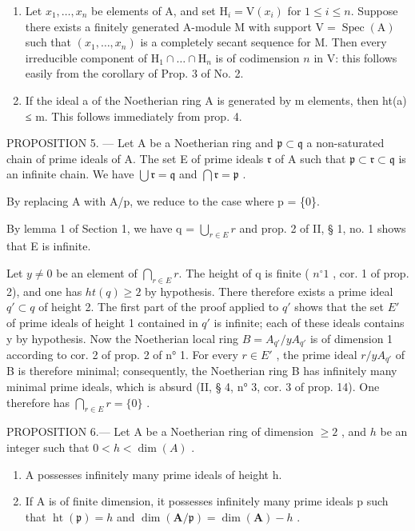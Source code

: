 \begin{enumerate}
\def\labelenumi{\arabic{enumi})}
\setcounter{enumi}{1}
\item
  Let \(x_1, \ldots, x_n\) be elements of A, and set \(\mathrm{H}_i = \mathrm{V}(x_i)\) for \(1 \leqslant i \leqslant n\). Suppose there exists a finitely generated A-module M with support \(\mathrm{V} = \operatorname{Spec}(\mathrm{A})\) such that \((x_1, \ldots, x_n)\) is a completely secant sequence for M. Then every irreducible component of \(\mathrm{H}_1 \cap \ldots \cap \mathrm{H}_n\) is of codimension \(n\) in V: this follows easily from the corollary of Prop. 3 of No. 2.
\item
  If the ideal a of the Noetherian ring A is generated by m elements, then ht(a) ≤ m. This follows immediately from prop. 4.
\end{enumerate}

PROPOSITION 5. --- Let A be a Noetherian ring and \(\mathfrak{p} \subset \mathfrak{q}\) a non-saturated chain of prime ideals of A. The set E of prime ideals \(\mathfrak{r}\) of A such that \(\mathfrak{p} \subset \mathfrak{r} \subset \mathfrak{q}\) is an infinite chain. We have \(\bigcup \mathfrak{r} = \mathfrak{q}\) and \(\bigcap \mathfrak{r} = \mathfrak{p}\) .

By replacing A with A/p, we reduce to the case where p = \{0\}.

By lemma 1 of Section 1, we have q = \(\bigcup_{r \in E} r\) and prop. 2 of II, § 1, no. 1 shows that E is infinite.

Let \(y \neq 0\) be an element of \(\bigcap_{r \in E} r\). The height of q is finite ( \(n^{\circ}1\) , cor. 1 of prop. 2), and one has \(ht(q) \geqslant 2\) by hypothesis. There therefore exists a prime ideal \(q' \subset q\) of height 2. The first part of the proof applied to \(q'\) shows that the set \(E'\) of prime ideals of height 1 contained in \(q'\) is infinite; each of these ideals contains y by hypothesis. Now the Noetherian local ring \(B = A_{q'} / yA_{q'}\) is of dimension 1 according to cor. 2 of prop. 2 of n° 1. For every \(r \in E'\) , the prime ideal \(r/yA_{q'}\) of B is therefore minimal; consequently, the Noetherian ring B has infinitely many minimal prime ideals, which is absurd (II, § 4, n° 3, cor. 3 of prop. 14). One therefore has \(\bigcap_{r \in E} r = \{0\}\) .

PROPOSITION 6.--- Let A be a Noetherian ring of dimension \(\geqslant 2\) , and \(h\) be an integer such that \(0 < h < \dim(A)\) .

\begin{enumerate}
\def\labelenumi{\alph{enumi})}
\item
  A possesses infinitely many prime ideals of height h.
\item
  If A is of finite dimension, it possesses infinitely many prime ideals p such that \(\operatorname{ht}(\mathfrak{p}) = h\) and \(\dim(\mathbf{A}/\mathfrak{p}) = \dim(\mathbf{A}) - h\) .
\end{enumerate}

